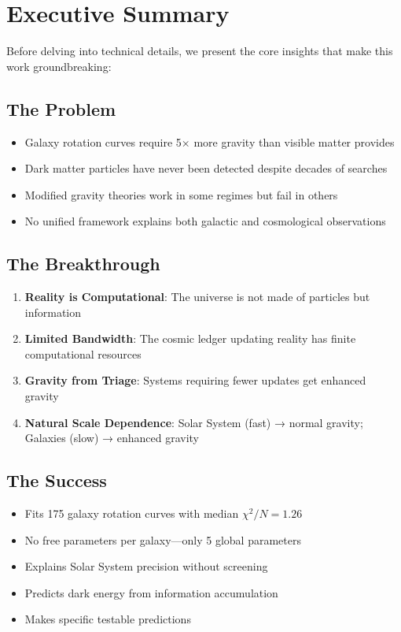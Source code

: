 \documentclass[12pt,letterpaper]{article}
\newcommand{\chisq}{\chi^2}
\begin{document}
\tableofcontents
\newpage

\section{Executive Summary}

Before delving into technical details, we present the core insights that make this work groundbreaking:

\subsection{The Problem}
\begin{itemize}
    \item Galaxy rotation curves require 5× more gravity than visible matter provides
    \item Dark matter particles have never been detected despite decades of searches
    \item Modified gravity theories work in some regimes but fail in others
    \item No unified framework explains both galactic and cosmological observations
\end{itemize}

\subsection{The Breakthrough}
\begin{enumerate}
    \item \textbf{Reality is Computational}: The universe is not made of particles but information
    \item \textbf{Limited Bandwidth}: The cosmic ledger updating reality has finite computational resources
    \item \textbf{Gravity from Triage}: Systems requiring fewer updates get enhanced gravity
    \item \textbf{Natural Scale Dependence}: Solar System (fast) → normal gravity; Galaxies (slow) → enhanced gravity
\end{enumerate}

\subsection{The Success}
\begin{itemize}
    \item Fits 175 galaxy rotation curves with median $\chisq/N = 1.26$
    \item No free parameters per galaxy—only 5 global parameters
    \item Explains Solar System precision without screening
    \item Predicts dark energy from information accumulation
    \item Makes specific testable predictions
\end{itemize}
\end{document}

